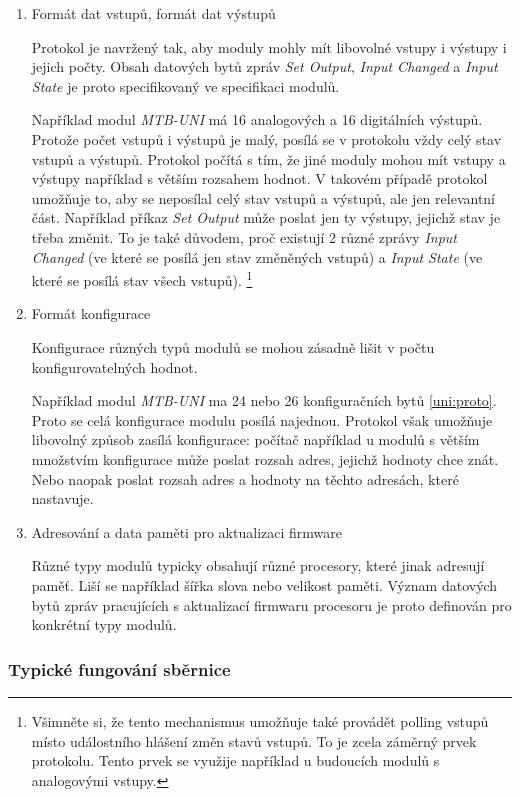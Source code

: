 \begin{enumerate}
\item Formát dat vstupů, formát dat výstupů

Protokol je navržený tak, aby moduly mohly mít libovolné vstupy i výstupy
i jejich počty. Obsah datových bytů zpráv \textit{Set Output}, \textit{Input
Changed} a \textit{Input State} je proto specifikovaný ve specifikaci modulů.

Například modul \textit{MTB-UNI} má 16 analogových a 16 digitálních výstupů.
Protože počet vstupů i výstupů je malý, posílá se v protokolu vždy celý stav
vstupů a výstupů. Protokol počítá s tím, že jiné moduly mohou mít vstupy a
výstupy například s větším rozsahem hodnot. V takovém případě protokol umožňuje
to, aby se neposílal celý stav vstupů a výstupů, ale jen relevantní část.
Například příkaz \textit{Set Output} může poslat jen ty výstupy, jejichž
stav je třeba změnit. To je také důvodem, proč existují 2 různé zprávy
\textit{Input Changed} (ve které se posílá jen stav změněných vstupů) a
\textit{Input State} (ve které se posílá stav všech vstupů).
\footnote{Všimněte si, že tento mechanismus umožňuje také provádět polling
vstupů místo událostního hlášení změn stavů vstupů. To je zcela záměrný prvek
protokolu. Tento prvek se využije například u budoucích modulů s analogovými
vstupy.}

\item Formát konfigurace

Konfigurace různých typů modulů se mohou zásadně lišit v počtu
konfigurovatelných hodnot.

Například modul \textit{MTB-UNI} ma 24 nebo 26 konfiguračních bytů
\ref{uni:proto}. Proto se celá konfigurace modulu posílá najednou.  Protokol
však umožňuje libovolný způsob zasílá konfigurace: počítač například u modulů s
větším množstvím konfigurace může poslat rozsah adres, jejichž hodnoty chce
znát. Nebo naopak poslat rozsah adres a hodnoty na těchto adresách, které
nastavuje.

\item Adresování a data paměti pro aktualizaci firmware

Různé typy modulů typicky obsahují různé procesory, které jinak adresují paměť.
Liší se například šířka slova nebo velikost paměti. Význam datových bytů
zpráv pracujících s aktualizací firmwaru procesoru je proto definován pro
konkrétní typy modulů.

\end{enumerate}

\subsubsection{Typické fungování sběrnice}

